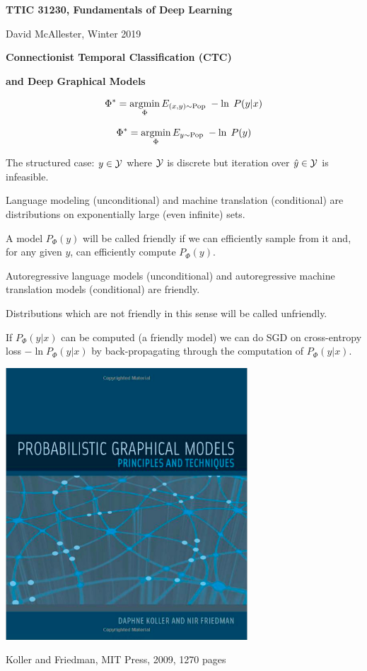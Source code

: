 




{\Huge

  \centerline{\bf TTIC 31230, Fundamentals of Deep Learning}
  \bigskip
  \centerline{David McAllester, Winter 2019}
  \vfill
  \centerline{\bf Connectionist Temporal Classification (CTC)}
  \vfill
  \centerline{\bf and Deep Graphical Models}
\vfill
\vfill
\vfill


\vfill
{\color{red}
$$\Phi^* = \operatorname*{argmin}_\Phi E_{(x,y) \sim \mathrm{Pop}}\;-\ln \;P(y|x)$$

\vfill
$$\Phi^* = \operatorname*{argmin}_\Phi E_{y \sim \mathrm{Pop}}\;-\ln \;P(y)$$
}

{\color{red} The structured case:} $y \in {\cal Y}$ where ${\cal Y}$ is discrete but {\color{red} iteration over $\hat{y} \in {\cal Y}$ is infeasible}.

\vfill
{\color{red} Language modeling} (unconditional) and {\color{red} machine translation} (conditional) are distributions on exponentially large (even infinite) sets.


A model $P_\Phi(y)$ will be called {\color{red} friendly} if we can efficiently sample from it and, for any given $y$, can efficiently compute $P_\Phi(y)$.

\vfill
{\color{red} Autoregressive} language models (unconditional) and autoregressive machine translation models (conditional) are {\color{red} friendly}.


\vfill
Distributions which are not friendly in this sense will be called {\color{red} unfriendly}.



{\color{red} If $P_\Phi(y|x)$ can be computed} (a friendly model)
we can do SGD on cross-entropy loss {\color{red} $- \ln P_\Phi(y|x)$} by back-propagating
through the computation of $P_\Phi(y|x)$.


\centerline{\includegraphics[height = 4in]{../images/Koller}}
\centerline{Koller and Friedman, MIT Press, 2009, 1270 pages}

}
